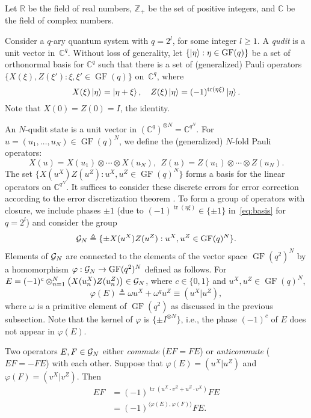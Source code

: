 \documentclass{ieeeaccess}
\DeclareMathOperator{\GF}{GF}
\DeclareMathOperator{\tr}{tr}
\newcommand{\teq}{\triangleq}
\newcommand{\sG}{{\cal G}}
\newcommand{\CC}{{\mathbb C}}
\newcommand{\RR}{{\mathbb R}}
\newcommand{\ZZ}{{\mathbb Z}}
\let\emph\textit
\theoremstyle{definition}		%
\begin{document}
Let $\RR$ be the field of real numbers, $\ZZ_+$ be the set of positive integers, and $\CC$ be the field of complex numbers.

Consider a $q$-ary quantum system with $q=2^l$, for some integer $l\ge 1$.
A \emph{qudit} is a unit vector in~$\CC^q$. 
Without loss of generality, let \mbox{$\{\ket \eta : \eta\in\GF(q)\}$} be a set of orthonormal basis for $\CC^q$ such that
there is a set of (generalized) Pauli operators $\{ X(\xi), Z(\xi'): \xi,\xi'\in\GF(q) \}$ on~$\CC^q$,   where
\begin{equation} \label{eq:basis}
X(\xi)\ket \eta = \ket{\eta+\xi}, \quad Z(\xi)\ket \eta = (-1)^{\tr(\eta \xi)}\ket \eta.
\end{equation}
Note that $X(0) = Z(0) = I$, the identity.

An $N$-qudit state is a unit vector in $(\CC^q)^{\otimes N} = \CC^{q^N}$.
For $u= (u_1,\dots,u_N)\in\GF(q)^N$, we define the (generalized) $N$-fold Pauli operators:
	$$X(u) = X(u_1)\otimes\cdots\otimes X(u_N), ~~ Z(u) = Z(u_1)\otimes\cdots\otimes Z(u_N).$$
The set  $\{X(u^X)Z(u^Z): u^X,u^Z\in\GF(q)^N\}$ forms a  basis for the linear operators on $\CC^{q^N}$.
It suffices to consider these discrete errors for error correction according to the error discretization theorem \cite{NC00}.
%
To form a group of operators with closure, we include phases $\pm 1$ (due to $(-1)^{\tr(\eta \xi)}\in\{\pm 1\}$ in~\eqref{eq:basis} for $q=2^l$) and consider the group
	$$\sG_N \teq \{\pm X(u^X)Z(u^Z): u^X,u^Z\in\GF(q)^N\}.$$
%
Elements of $\sG_N$ are connected to the elements of the vector space $\GF(q^2)^N$ 
by a homomorphism $\varphi:\sG_N \to \GF(q^2)^N$ defined as follows.  
For   $E = (-1)^c \otimes_{n=1}^N \left(X(u^X_{n}) Z(u^Z_{n})\right)\in\sG_N$, where $c\in\{0,1\}$ and $u^X,u^Z\in\GF(q)^N$,
\begin{equation} \label{eq:E2u}
\varphi(E) \teq \omega u^X + \omega^{q} u^Z \equiv (u^X|u^Z),
\end{equation}
where $\omega$ is a primitive element of $\GF(q^2)$ as discussed in the previous subsection.
%
Note that the kernel of $\varphi$ is $\{\pm I^{\otimes N}\}$, i.e., the phase $(-1)^c$ of $E$ does not appear in $\varphi(E)$.


Two operators $E,F\in\sG_N$ either \emph{commute} \mbox{($EF= FE$)} or \emph{anticommute} \mbox{($EF = - FE$)} with each other.
Suppose that $\varphi(E)=(u^X|u^Z)$ and $\varphi(F)=(v^X|v^Z)$. Then
\begin{align*}
EF &= (-1)^{\tr(u^X\cdot v^Z + u^Z\cdot v^X)}FE\\
   &= (-1)^{\langle \varphi(E),\varphi(F) \rangle}FE.
\end{align*}
\end{document}
